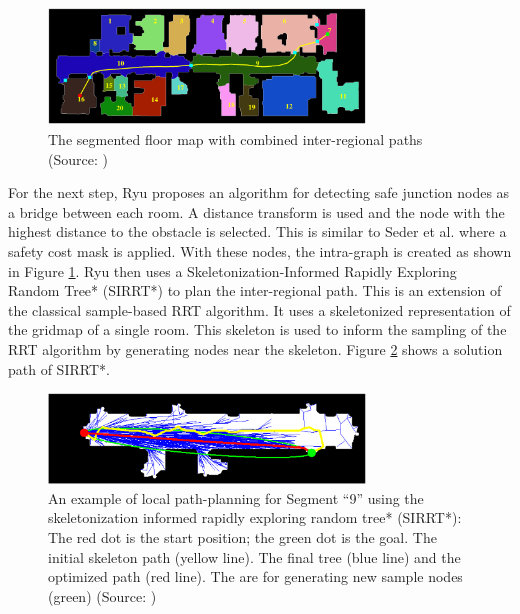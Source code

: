 \begin{figure}[h]
    \centering
    \includegraphics[width=0.75\textwidth]{figures/20_state_of_the_art/ryu_floor_path.png}
    \caption[The segmented floor map with combined inter-regional paths]{The segmented floor map with combined inter-regional paths (Source: \cite{ryu_hierarchical_2020})}
    \label{fig:ryu_floor_path}
\end{figure}

For the next step, Ryu proposes an algorithm for detecting safe junction nodes as a bridge between each room. A distance transform is used and the node with the highest distance to the obstacle is selected. This is similar to Seder et al. where a safety cost mask is applied. With these nodes, the intra-graph is created as shown in Figure \ref{fig:ryu_floor_path}. Ryu then uses a Skeletonization-Informed Rapidly Exploring Random Tree* (SIRRT*) to plan the inter-regional path. This is an extension of the classical sample-based RRT algorithm. It uses a skeletonized representation of the gridmap of a single room. This skeleton is used to inform the sampling of the RRT algorithm by generating nodes near the skeleton. Figure \ref{fig:ryu_sirrt} shows a solution path of SIRRT*. 

\begin{figure}[h]
    \centering
    \includegraphics[width=0.75\textwidth]{figures/20_state_of_the_art/ryu_sirrt.png}
    \caption[Path planning with the SIRRT*]{An example of local path-planning for Segment “9” using the skeletonization informed rapidly exploring random tree* (SIRRT*): The red dot is the start position; the green dot is the goal. The initial skeleton path (yellow line). The final tree (blue line) and the optimized path (red line). The are for generating new sample nodes (green) (Source: \cite{ryu_hierarchical_2020})}
    \label{fig:ryu_sirrt}
\end{figure}

